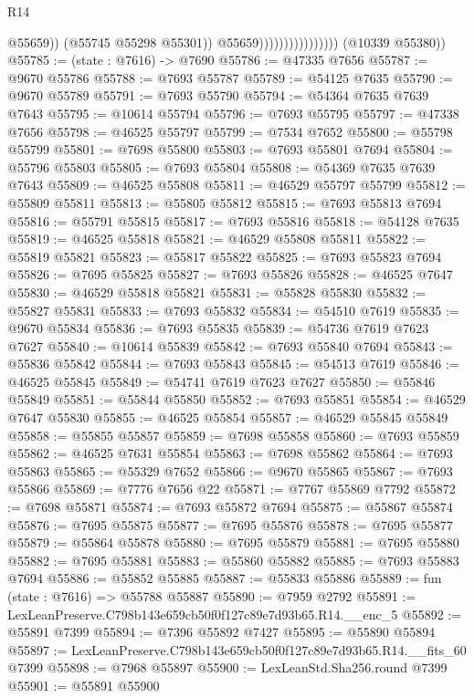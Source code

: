 \begin{lexlean}{R14}
\begin{coremodule}
                                            @55659))
                                        (@55745 @55298 @55301))
                                      @55659))))))))))))))))
      (@10339 @55380))
@55785 := (state : @7616) -> @7690
@55786 := @47335 @7656
@55787 := @9670 @55786
@55788 := @7693 @55787
@55789 := @54125 @7635
@55790 := @9670 @55789
@55791 := @7693 @55790
@55794 := @54364 @7635 @7639 @7643
@55795 := @10614 @55794
@55796 := @7693 @55795
@55797 := @47338 @7656
@55798 := @46525 @55797
@55799 := @7534 @7652
@55800 := @55798 @55799
@55801 := @7698 @55800
@55803 := @7693 @55801 @7694
@55804 := @55796 @55803
@55805 := @7693 @55804
@55808 := @54369 @7635 @7639 @7643
@55809 := @46525 @55808
@55811 := @46529 @55797 @55799
@55812 := @55809 @55811
@55813 := @55805 @55812
@55815 := @7693 @55813 @7694
@55816 := @55791 @55815
@55817 := @7693 @55816
@55818 := @54128 @7635
@55819 := @46525 @55818
@55821 := @46529 @55808 @55811
@55822 := @55819 @55821
@55823 := @55817 @55822
@55825 := @7693 @55823 @7694
@55826 := @7695 @55825
@55827 := @7693 @55826
@55828 := @46525 @7647
@55830 := @46529 @55818 @55821
@55831 := @55828 @55830
@55832 := @55827 @55831
@55833 := @7693 @55832
@55834 := @54510 @7619
@55835 := @9670 @55834
@55836 := @7693 @55835
@55839 := @54736 @7619 @7623 @7627
@55840 := @10614 @55839
@55842 := @7693 @55840 @7694
@55843 := @55836 @55842
@55844 := @7693 @55843
@55845 := @54513 @7619
@55846 := @46525 @55845
@55849 := @54741 @7619 @7623 @7627
@55850 := @55846 @55849
@55851 := @55844 @55850
@55852 := @7693 @55851
@55854 := @46529 @7647 @55830
@55855 := @46525 @55854
@55857 := @46529 @55845 @55849
@55858 := @55855 @55857
@55859 := @7698 @55858
@55860 := @7693 @55859
@55862 := @46525 @7631 @55854
@55863 := @7698 @55862
@55864 := @7693 @55863
@55865 := @55329 @7652
@55866 := @9670 @55865
@55867 := @7693 @55866
@55869 := @7776 @7656 @22
@55871 := @7767 @55869 @7792
@55872 := @7698 @55871
@55874 := @7693 @55872 @7694
@55875 := @55867 @55874
@55876 := @7695 @55875
@55877 := @7695 @55876
@55878 := @7695 @55877
@55879 := @55864 @55878
@55880 := @7695 @55879
@55881 := @7695 @55880
@55882 := @7695 @55881
@55883 := @55860 @55882
@55885 := @7693 @55883 @7694
@55886 := @55852 @55885
@55887 := @55833 @55886
@55889 := fun (state : @7616) => @55788 @55887
@55890 := @7959 @2792
@55891 := LexLeanPreserve.C798b143e659cb50f0f127c89e7d93b65.R14.__enc_5
@55892 := @55891 @7399
@55894 := @7396 @55892 @7427
@55895 := @55890 @55894
@55897 := LexLeanPreserve.C798b143e659cb50f0f127c89e7d93b65.R14.__fits_60 @7399
@55898 := @7968 @55897
@55900 := LexLeanStd.Sha256.round @7399
@55901 := @55891 @55900

\end{coremodule}
\end{lexlean}
